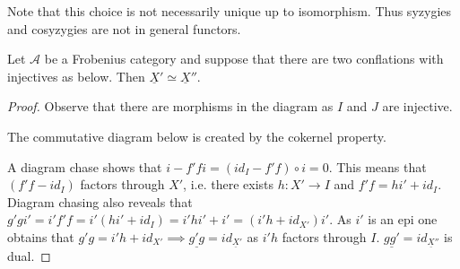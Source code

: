     \begin{remark}
        Note that this choice is not necessarily unique up to isomorphism. Thus syzygies and cosyzygies are not in general functors.
    \end{remark}

    \begin{lemma}
        Let $\mathcal{A}$ be a Frobenius category and suppose that there are two conflations with injectives as below. Then $\underline{X}'\simeq\underline{X}''$.
        \begin{center}
        \end{center}
    \end{lemma}

    \begin{proof}
        Observe that there are morphisms in the diagram as $I$ and $J$ are injective.
        \begin{center}
        \end{center}
        The commutative diagram below is created by the cokernel property.
        \begin{center}
        \end{center}
    A diagram chase shows that $i-f'fi=(id_I-f'f)\circ i = 0$. This means that $(f'f-id_I)$ factors through $X'$, i.e. there exists $h:X'\rightarrow I$ and $f'f = hi'+id_I$. Diagram chasing also reveals that $g'gi' = i'f'f = i'(hi' +id_I) = i'hi' + i' = (i'h+id_{X'})i'$. As $i'$ is an epi one obtains that $g'g = i'h + id_{X'} \implies \underline{g'g}=id_{\underline{X}'}$ as $i'h$ factors through $I$. $\underline{gg'}=id_{\underline{X}''}$ is dual.
    \end{proof}

